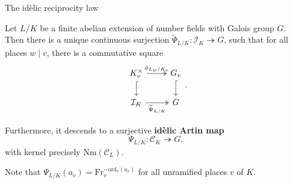 \documentclass[10pt]{beamer}
\begin{document}
\begin{frame}[t]{The id\`elic reciprocity law}

\begin{theorem}
Let $ L / K $ be a finite abelian extension of number fields with Galois group $ G $. \pause Then there is a unique continuous surjection $ \widetilde{\Psi}_{L / K} : \mathcal{I}_K \twoheadrightarrow G $, such that for all places $ w \mid v $, there is a commutative square
$$
\begin{tikzcd}[ampersand replacement=\&]
K_v^\times \arrow[twoheadrightarrow]{r}{\phi_{L_w / K_v}} \arrow[hookrightarrow]{d} \& G_v \arrow[hookrightarrow]{d} \\
\mathcal{I}_K \arrow[twoheadrightarrow]{r}[swap]{\widetilde{\Psi}_{L / K}} \& G
\end{tikzcd}.
$$

\pause

Furthermore, it descends to a surjective \textbf{id\`elic Artin map}
$$ \Psi_{L / K} : \mathcal{C}_K \twoheadrightarrow G, $$
with kernel precisely $ \mathrm{Nm}(\mathcal{C}_L) $.
\end{theorem}

\pause

Note that $ \Psi_{L / K}(a_v) = \mathrm{Fr}_v^{-\mathrm{ord}_v(a_v)} $ for all unramified places $ v $ of $ K $.

\end{frame}
\end{document}
